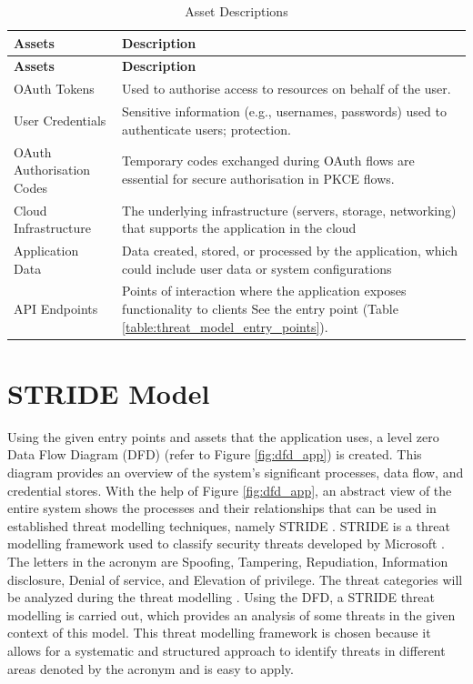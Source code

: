 \begin{longtable}{|p{8cm}|p{8cm}|}
\caption{Asset Descriptions}
\label{table:threat_model_assets}
\hline
\rowcolor{grey!15}
\textbf{Assets} & \textbf{Description} \\
\hline
\endfirsthead

\hline
\rowcolor{grey!15}
\textbf{Assets} & \textbf{Description} \\
\hline
\endhead

OAuth Tokens & Used to authorise access to resources on behalf of the user. \\
\hline
User Credentials & Sensitive information (e.g., usernames, passwords) used to authenticate users; protection. \\
\hline
OAuth Authorisation Codes & Temporary codes exchanged during OAuth flows are essential for secure authorisation in PKCE flows. \\
\hline
Cloud Infrastructure & The underlying infrastructure (servers, storage, networking) that supports the application in the cloud \\
\hline
Application Data & Data created, stored, or processed by the application, which could include user data or system configurations \\
\hline
API Endpoints & Points of interaction where the application exposes functionality to clients See the entry point (Table \ref{table:threat_model_entry_points}). \\
\hline

\end{longtable}


\section{STRIDE Model}
Using the given entry points and assets that the application uses, a level zero Data Flow Diagram (DFD) (refer to Figure \ref{fig:dfd_app}) is created. This diagram provides an overview of the system's significant processes, data flow, and credential stores. With the help of Figure \ref{fig:dfd_app}, an abstract view of the entire system shows the processes and their relationships that can be used in established threat modelling techniques, namely STRIDE \citep{dfd_stride}. STRIDE is a threat modelling framework used to classify security threats developed by Microsoft \citep{stride_usage}. The letters in the acronym are Spoofing, Tampering, Repudiation, Information disclosure, Denial of service, and Elevation of privilege. The threat categories will be analyzed during the threat modelling \citep{stride}. Using the DFD, a STRIDE threat modelling is carried out, which provides an analysis of some threats in the given context of this model. This threat modelling framework is chosen because it allows for a systematic and structured approach to identify threats in different areas denoted by the acronym and is easy to apply.



